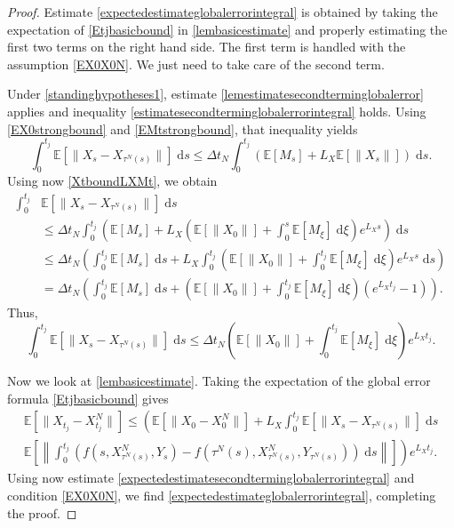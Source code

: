 \documentclass[reqno,12pt]{amsart}
\theoremstyle{plain} %
\theoremstyle{definition} %
\begin{document}
\begin{proof}
    Estimate \eqref{expectedestimateglobalerrorintegral} is obtained by taking the expectation of \eqref{Etjbasicbound} in \cref{lembasicestimate} and properly estimating the first two terms on the right hand side. The first term is handled with the assumption \eqref{EX0X0N}. We just need to take care of the second term.
    
    Under \cref{standinghypotheses1}, estimate \cref{lemestimatesecondterminglobalerror} applies and inequality \eqref{estimatesecondterminglobalerrorintegral} holds.
    Using \eqref{EX0strongbound} and \eqref{EMtstrongbound}, that inequality yields
    \[
        \int_0^{t_j} \mathbb{E}[\|X_s - X_{\tau^N(s)}\|] \;\mathrm{d}s \leq \Delta t_N \int_0^{t_j} (\mathbb{E}[M_s] + L_X\mathbb{E}[\|X_s\|]) \;\mathrm{d}s.
    \]
    Using now \eqref{XtboundLXMt}, we obtain
    \begin{align*}
        \int_0^{t_j} & \mathbb{E}[\|X_s - X_{\tau^N(s)}\|] \;\mathrm{d}s \\
        & \leq \Delta t_N \int_0^{t_j} \left(\mathbb{E}[M_s] + L_X\left(\mathbb{E}[\|X_0\|] + \int_0^s \mathbb{E}[M_\xi]\;\mathrm{d}\xi\right)e^{L_X s} \right)\;\mathrm{d}s \\
        & \leq \Delta t_N \left(\int_0^{t_j} \mathbb{E}[M_s] \;\mathrm{d}s + L_X \int_0^{t_j}\left(\mathbb{E}[\|X_0\|] + \int_0^{t_j} \mathbb{E}[M_\xi]\;\mathrm{d}\xi\right)e^{L_X s} \;\mathrm{d}s\right) \\
        & = \Delta t_N \left(\int_0^{t_j} \mathbb{E}[M_s] \;\mathrm{d}s + \left(\mathbb{E}[\|X_0\|] + \int_0^{t_j} \mathbb{E}[M_\xi]\;\mathrm{d}\xi\right)\left(e^{L_X t_j} - 1\right) \right).
    \end{align*}
    Thus,
    \begin{equation}
        \label{expectedestimatesecondterminglobalerrorintegral}
        \int_0^{t_j} \mathbb{E}[\|X_s - X_{\tau^N(s)}\|] \;\mathrm{d}s \leq \Delta t_N\left(\mathbb{E}[\|X_0\|] + \int_0^{t_j} \mathbb{E}[M_\xi]\;\mathrm{d}\xi\right)e^{L_X t_j}.
    \end{equation}

    Now we look at \cref{lembasicestimate}. Taking the expectation of the global error formula \eqref{Etjbasicbound} gives
    \begin{multline*}
        \mathbb{E}\left[\|X_{t_j} - X_{t_j}^N\|\right] \leq \left( \mathbb{E}\left[\|X_0 - X_0^N\|\right] + L_X \int_0^{t_j} \mathbb{E}\left[\|X_s - X_{\tau^N(s)}\|\right] \;\mathrm{d}s \right. \\
        \left. \mathbb{E}\left[\left\|\int_0^{t_j} \left( f(s, X_{\tau^N(s)}^N, Y_s) - f(\tau^N(s), X_{\tau^N(s)}^N, Y_{\tau^N(s)}) \right)\;\mathrm{d}s\right\|\right]\right) e^{L_X t_j}.
    \end{multline*}
    Using now estimate \eqref{expectedestimatesecondterminglobalerrorintegral} and condition \eqref{EX0X0N}, we find \eqref{expectedestimateglobalerrorintegral}, completing the proof.
\end{proof}
\end{document}
